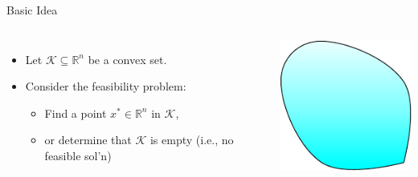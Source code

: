 \documentclass[10pt,ignorenonframetext,serif,onlymath]{beamer}
\providecommand{\tightlist}{%
  \setlength{\itemsep}{0pt}\setlength{\parskip}{0pt}}
\begin{document}
\begin{frame}{Basic Idea}
\protect\hypertarget{basic-idea}{}

\begin{columns}


\begin{itemize}
\tightlist
\item
  Let \(\mathcal{K} \subseteq \mathbb{R}^n\) be a convex set.
\item
  Consider the feasibility problem:

  \begin{itemize}
  \tightlist
  \item
    Find a point \(x^* \in \mathbb{R}^n\) in \(\mathcal{K}\),
  \item
    or determine that \(\mathcal{K}\) is empty (i.e., no feasible sol’n)
  \end{itemize}
\end{itemize}


\includegraphics{ellipsoid.files/region.pdf}

\end{columns}

\end{frame}
\end{document}
